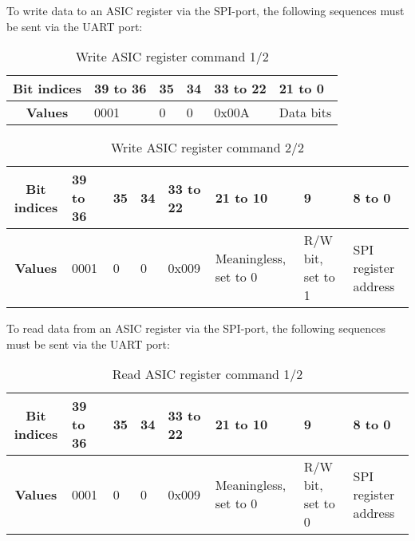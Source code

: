 To write data to an ASIC register via the SPI-port, the following sequences must be sent via the UART port:


\begin{table}[H]

\caption[]{Write ASIC register command 1/2}
    \label{tab:6}
    
  \begin{center}  
  \begin{tabular}{|c|p{2cm}|p{2cm}|p{2.5cm}|p{2cm}|p{2cm}|}
  \hline
  \textbf{Bit indices}  & 39 to 36  & 35 & 34 & 33 to 22 & 21 to 0\\ 
  \hline
  \textbf{Values} & 0001  & 0 & 0 & 0x00A & Data bits \\
  \hline
  
\end{tabular}
\end{center}
\end{table}

\begin{table}[H]

\caption[]{Write ASIC register command 2/2}
    \label{tab:7}
    
  \begin{center}  
  \begin{tabular}{|c|p{1.5cm}|p{0.7cm}|p{1cm}|p{1cm}|p{1cm}|p{2cm}|p{2cm}|}
  \hline
  \textbf{Bit indices}  & 39 to 36  & 35 & 34 & 33 to 22 & 21 to 10 & 9 & 8 to 0\\ 
  \hline
  \textbf{Values} & 0001  & 0 & 0 & 0x009 & Meaningless, set to 0 & R/W bit, set to 1 & SPI register address \\
  \hline
  
\end{tabular}
\end{center}
\end{table}

To read data from an ASIC register via the SPI-port, the following sequences must be sent via the UART port:

\begin{table}[H]

\caption[]{Read ASIC register command 1/2}
    \label{tab:8}
    
  \begin{center}  
  \begin{tabular}{|c|p{1.5cm}|p{0.7cm}|p{1cm}|p{1cm}|p{1cm}|p{2cm}|p{2cm}|}
  \hline
  \textbf{Bit indices}  & 39 to 36  & 35 & 34 & 33 to 22 & 21 to 10 & 9 & 8 to 0\\ 
  \hline
  \textbf{Values} & 0001  & 0 & 0 & 0x009 & Meaningless, set to 0 & R/W bit, set to 0 & SPI register address \\
  \hline
  
\end{tabular}
\end{center}
\end{table}

